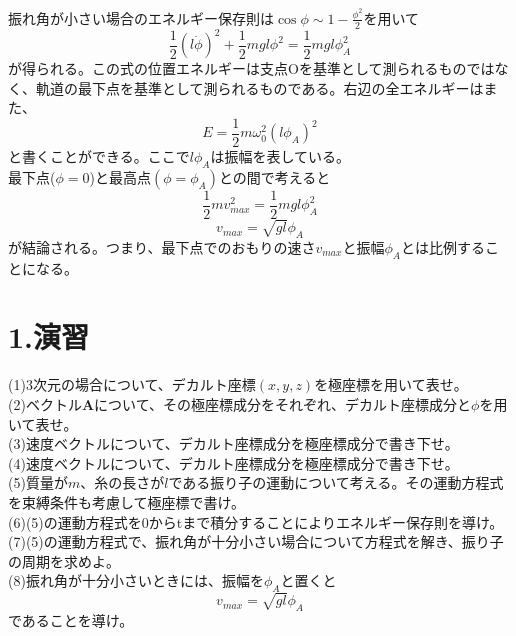 \documentclass{jsarticle}
\begin{document}
振れ角が小さい場合のエネルギー保存則は\(\cos\phi\sim1-\frac{\phi^2}{2}\)を用いて
\[\frac{1}{2}(l\dot{\phi})^2+\frac{1}{2}mgl\phi^2=\frac{1}{2}mgl\phi_{A}^2\]
が得られる。この式の位置エネルギーは支点Oを基準として測られるものではなく、軌道の最下点を基準として測られるものである。右辺の全エネルギーはまた、
\[E=\frac{1}{2}m\omega_{0}^2(l\phi_{A})^2\]
と書くことができる。ここで\(l\phi_{A}\)は振幅を表している。\\
最下点(\(\phi=0\))と最高点\((\phi=\phi_{A})\)との間で考えると
\[\frac{1}{2}mv_{max}^2=\frac{1}{2}mgl\phi_{A}^2\]
\[v_{max}=\sqrt{gl}\phi_{A}\]
が結論される。つまり、最下点でのおもりの速さ\(v_{max}\)と振幅\(\phi_{A}\)とは比例することになる。\\
\section*{1.演習}
\noindent
(1)3次元の場合について、デカルト座標\((x,y,z)\)を極座標を用いて表せ。\\
(2)ベクトル\(\bm{A}\)について、その極座標成分をそれぞれ、デカルト座標成分と\(\phi\)を用いて表せ。\\
(3)速度ベクトルについて、デカルト座標成分を極座標成分で書き下せ。\\
(4)速度ベクトルについて、デカルト座標成分を極座標成分で書き下せ。\\
(5)質量が\(m\)、糸の長さが\(l\)である振り子の運動について考える。その運動方程式を束縛条件も考慮して極座標で書け。\\
(6)\hspace{3mm}(5)の運動方程式を0からtまで積分することによりエネルギー保存則を導け。\\
(7)\hspace{3mm}(5)の運動方程式で、振れ角が十分小さい場合について方程式を解き、振り子の周期を求めよ。\\
(8)\hspace{5mm}振れ角が十分小さいときには、振幅を\(\phi_{A}\)と置くと
\[v_{max}=\sqrt{gl}\phi_{A}\]
であることを導け。



















\newpage
\end{document}
